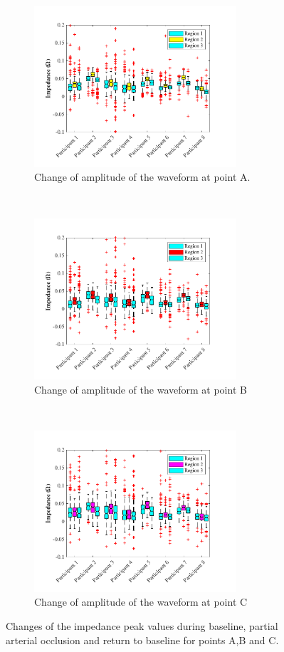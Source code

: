 \begin{figure}[!htpb]
	\centering
	\begin{subfigure}[t]{0.48\textwidth}
	\centering
		\includegraphics[height=6cm,keepaspectratio]{figure7a2}    
		\caption{Change of amplitude of the waveform at point A.}
		\label{fig:change_A_venous}
	\end{subfigure}%
	~ 
	\begin{subfigure}[t]{0.48\textwidth}
		\centering
		\includegraphics[height=6cm,keepaspectratio,keepaspectratio]{figure7b2}    
		\caption{Change of amplitude of the waveform at point B}
		\label{fig:change_B_venous}
	\end{subfigure}
	~
	\begin{subfigure}[t]{0.48\textwidth}
		\centering
		\includegraphics[height=6cm,keepaspectratio]{figure7c2}    
		\caption{Change of amplitude of the waveform at point C}
		\label{fig:change_C_venous}
\end{subfigure}%
	\caption{Changes of the impedance peak values during baseline, partial arterial occlusion and return to baseline for points A,B and C.}
	\label{fig:iPG_change_points_venous}
\end{figure}

